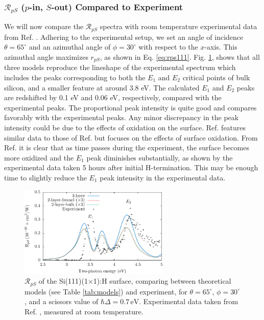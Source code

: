 
\subsubsection{\texorpdfstring{$\mathcal{R}_{pS}$}{RpS} ($p$-in, $S$-out)
Compared to Experiment}\label{sec:1x1RpS}

We will now compare the $\mathcal{R}_{pS}$ spectra with room temperature
experimental data from Ref. \cite{mejiaPRB02}. Adhering to the experimental
setup, we set an angle of incidence $\theta=65^{\circ}$ and an azimuthal angle
of $\phi=30^{\circ}$ with respect to the $x$-axis. This azimuthal angle
maximizes $r_{pS}$, as shown in Eq. \eqref{eq:rps111}. Fig. \ref{fig:RpS}, shows
that all three models reproduce the lineshape of the experimental spectrum which
includes the peaks corresponding to both the $E_{1}$ and $E_{2}$ critical points
of bulk silicon, and a smaller feature at around 3.8 eV. The calculated $E_{1}$
and $E_{2}$ peaks are redshifted by 0.1 eV and 0.06 eV, respectively, compared
with the experimental peaks. The proportional peak intensity is quite good and
compares favorably with the experimental peaks. Any minor discrepancy in the
peak intensity could be due to the effects of oxidation on the surface. Ref.
\cite{bergfeldPRL04} features similar data to those of Ref. \cite{mejiaPRB02}
but focuses on the effects of surface oxidation. From Ref. \cite{bergfeldPRL04}
it is clear that as time passes during the experiment, the surface becomes more
oxidized and the $E_{1}$ peak diminishes substantially, as shown by the
experimental data taken 5 hours after initial H-termination. This may be enough
time to slightly reduce the $E_{1}$ peak intensity in the experimental data.

\begin{figure}[t]
\centering
\includegraphics[width=0.64\textwidth]{content/figures/fig-Si1x1-Mejia_RpS}
\caption[$\mathcal{R}_{pS}$ compared to experimental data from Mejia et al.]
{$\mathcal{R}_{pS}$ of the Si(111)(1$\times$1):H surface, comparing between
theoretical models (see Table \ref{tab:models}) and experiment, for
$\theta=65^{\circ}$, $\phi=30^{\circ}$, and a scissors value of $\hbar\Delta =
0.7\,\text{eV}$. Experimental data taken from Ref.
\cite{mejiaPRB02}, measured at room temperature.}
\label{fig:RpS}
\end{figure}

